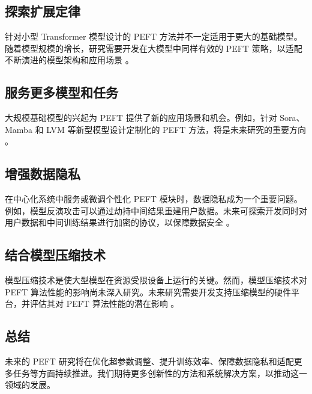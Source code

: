 \documentclass[12pt,a4paper,twoside]{article} %
\begin{document}
\begin{multicols}{2}
\subsection{探索扩展定律}
针对小型 Transformer 模型设计的 PEFT 方法并不一定适用于更大的基础模型。随着模型规模的增长，研究需要开发在大模型中同样有效的 PEFT 策略，以适配不断演进的模型架构和应用场景 \cite{peft_survey}。

\subsection{服务更多模型和任务}
大规模基础模型的兴起为 PEFT 提供了新的应用场景和机会。例如，针对 Sora、Mamba 和 LVM 等新型模型设计定制化的 PEFT 方法，将是未来研究的重要方向 \cite{sora_model}。

\subsection{增强数据隐私}
在中心化系统中服务或微调个性化 PEFT 模块时，数据隐私成为一个重要问题。例如，模型反演攻击可以通过劫持中间结果重建用户数据。未来可探索开发同时对用户数据和中间训练结果进行加密的协议，以保障数据安全 \cite{privacy_encryption1}。

\subsection{结合模型压缩技术}
模型压缩技术是使大型模型在资源受限设备上运行的关键。然而，模型压缩技术对 PEFT 算法性能的影响尚未深入研究。未来研究需要开发支持压缩模型的硬件平台，并评估其对 PEFT 算法性能的潜在影响 \cite{model_compression1}。

\subsection{总结}
未来的 PEFT 研究将在优化超参数调整、提升训练效率、保障数据隐私和适配更多任务等方面持续推进。我们期待更多创新性的方法和系统解决方案，以推动这一领域的发展。





\end{multicols}
\end{document}
